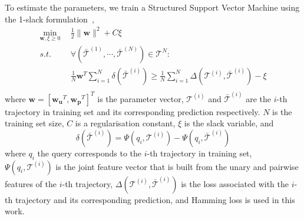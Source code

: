 To estimate the parameters, we train a Structured Support Vector Machine using the 1-slack formulation~\cite{ssvm09},
\begin{align*}
    \min_{\mathbf{w}, \xi \ge 0} ~~& \frac{1}{2} \|\mathbf{w}\|^2 + C \xi \\
    s.t. ~~& \forall \left( \bar{\mathcal{T}}^{(1)}, \cdots, \bar{\mathcal{T}}^{(N)} \right) \in \mathscr{T}^N: \\
         ~~& \frac{1}{N} \mathbf{w}^T \sum_{i=1}^N \delta \left( \bar{\mathcal{T}}^{(i)} \right) \ge
             \frac{1}{N} \sum_{i=1}^N \Delta \left( \mathcal{T}^{(i)}, \bar{\mathcal{T}}^{(i)} \right) - \xi \\
\end{align*}
where $\mathbf{w} = [\mathbf{w_u}^T, \mathbf{w_p}^T]^T$ is the parameter vector,
$\mathcal{T}^{(i)}$ and $\bar{\mathcal{T}}^{(i)}$ are the $i$-th trajectory in training set
and its corresponding prediction respectively.
$N$ is the training set size, $C$ is a regularisation constant,
$\xi$ is the slack variable, and
\begin{displaymath}
    \delta \left( \bar{\mathcal{T}}^{(i)} \right) = \Psi \left( q_i, \mathcal{T}^{(i)} \right) - 
                                                    \Psi \left( q_i, \bar{\mathcal{T}}^{(i)} \right)
\end{displaymath}
where $q_i$ the query corresponds to the $i$-th trajectory in training set,
$\Psi \left( q_i, \mathcal{T}^{(i)} \right)$ is the joint feature vector that is built from the unary and pairwise features of the $i$-th trajectory,
$\Delta \left( \mathcal{T}^{(i)}, \bar{\mathcal{T}}^{(i)} \right)$ is the loss associated with the $i$-th trajectory 
and its corresponding prediction, and Hamming loss is used in this work.
